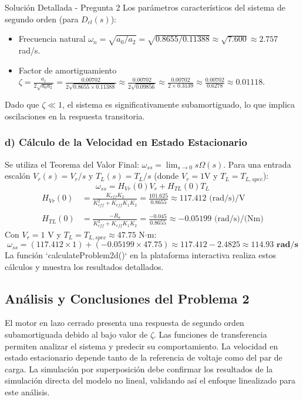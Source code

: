\documentclass[12pt]{article}
\begin{document}
\begin{solutionbox}{Solución Detallada - Pregunta 2}
Los parámetros característicos del sistema de segundo orden (para $D_{cl}(s)$):
\begin{itemize}
    \item Frecuencia natural $\omega_n = \sqrt{a_0/a_2} = \sqrt{0.8655 / 0.11388} \approx \sqrt{7.600} \approx 2.757$ rad/s.
    \item Factor de amortiguamiento $\zeta = \frac{a_1}{2\sqrt{a_0 a_2}} = \frac{0.00702}{2\sqrt{0.8655 \times 0.11388}} \approx \frac{0.00702}{2\sqrt{0.09856}} \approx \frac{0.00702}{2 \times 0.3139} \approx \frac{0.00702}{0.6278} \approx 0.01118$.
\end{itemize}
Dado que $\zeta \ll 1$, el sistema es significativamente subamortiguado, lo que implica oscilaciones en la respuesta transitoria.

\subsubsection*{d) Cálculo de la Velocidad en Estado Estacionario}
Se utiliza el Teorema del Valor Final: $\omega_{ss} = \lim_{s \to 0} s \Omega(s)$.
Para una entrada escalón $V_r(s) = V_r/s$ y $T_L(s) = T_L/s$ (donde $V_r=1$V y $T_L=T_{L,spec}$):
\[ \omega_{ss} = H_{Vr}(0)V_r + H_{TL}(0)T_L \]
\begin{align*}
    H_{Vr}(0) &= \frac{K_{eff}K_2}{K_{eff}^2 + K_{eff}K_1K_2} = \frac{101.625}{0.8655} \approx 117.412 \text{ (rad/s)/V} \\\\
    H_{TL}(0) &= \frac{-R_a}{K_{eff}^2 + K_{eff}K_1K_2} = \frac{-0.045}{0.8655} \approx -0.05199 \text{ (rad/s)/(Nm)}
\end{align*}
Con $V_r = 1$ V y $T_L = T_{L,spec} \approx 47.75$ N$\cdot$m:
\[ \omega_{ss} = (117.412 \times 1) + (-0.05199 \times 47.75) \approx 117.412 - 2.4825 \approx \mathbf{114.93 \text{ rad/s}} \]
La función `calculateProblem2d()` en la plataforma interactiva realiza estos cálculos y muestra los resultados detallados.

\subsection*{Análisis y Conclusiones del Problema 2}
El motor en lazo cerrado presenta una respuesta de segundo orden subamortiguada debido al bajo valor de $\zeta$. Las funciones de transferencia permiten analizar el sistema y predecir su comportamiento. La velocidad en estado estacionario depende tanto de la referencia de voltaje como del par de carga. La simulación por superposición debe confirmar los resultados de la simulación directa del modelo no lineal, validando así el enfoque linealizado para este análisis.

\end{solutionbox}
\end{document}
